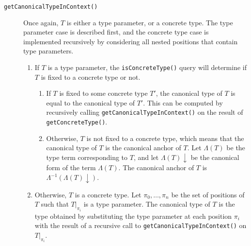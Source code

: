 \documentclass[headsepline,bibliography=totoc]{scrreport}
\theoremstyle{definition}
\theoremstyle{definition}
\theoremstyle{definition}
\begin{document}
\begin{description}
\item[\texttt{getCanonicalTypeInContext()}] Once again, $T$ is either a type parameter, or a concrete type. The type parameter case is described first, and the concrete type case is implemented recursively by considering all nested positions that contain type parameters.
\begin{enumerate}
\item
If $T$ is a type parameter, the \texttt{isConcreteType()} query will determine if $T$ is fixed to a concrete type or not.
\begin{enumerate}
\item If $T$ is fixed to some concrete type $T'$, the canonical type of $T$ is equal to the canonical type of $T'$. This can be computed by recursively calling \texttt{getCanonicalTypeInContext()} on the result of \texttt{getConcreteType()}.
\item Otherwise, $T$ is not fixed to a concrete type, which means that the canonical type of $T$ is the canonical anchor of $T$. Let $\Lambda(T)$ be the type term corresponding to $T$, and let $\Lambda(T){\downarrow}$ be the canonical form of the term $\Lambda(T)$. The canonical anchor of $T$ is $\Lambda^{-1}(\Lambda(T){\downarrow})$.
\end{enumerate}

\item
Otherwise, $T$ is a concrete type. Let $\pi_0,\ldots,\pi_n$ be the set of positions of $T$ such
that $T|_{\pi_i}$ is a type parameter. The canonical type of $T$ is the type obtained by substituting the type parameter at each position $\pi_i$ with the result of a recursive call to \texttt{getCanonicalTypeInContext()} on $T|_{\pi_i}$.
\end{enumerate}
\end{description}
\end{document}
